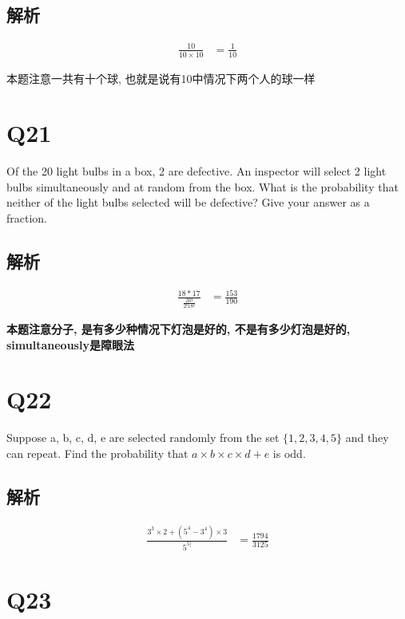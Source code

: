   \subsection{解析}

    \begin{align*}
      \frac{10}{10 \times 10} &= \frac{1}{10}
    \end{align*}

    本题注意一共有十个球, 也就是说有10中情况下两个人的球一样

\section{Q21}

  Of the 20 light bulbs in a box, 2 are defective. An inspector will select
  2 light bulbs simultaneously and at random from the box. What is the
  probability that neither of the light bulbs selected will be defective?
  Give your answer as a fraction.

  \subsection{解析}

    \begin{align*}
      \frac{18 * 17}{\frac{20!}{2! 18!}} &= \frac{153}{190}
    \end{align*}

    \textbf{本题注意分子, 是有多少种情况下灯泡是好的, 不是有多少灯泡是好的,
    simultaneously是障眼法}

\section{Q22}

  Suppose a, b, c, d, e are selected randomly from the set
  $ \{ 1, 2, 3, 4, 5 \} $ and they can repeat. Find the probability that
  $ a \times b \times c \times d + e $ is odd.

  \subsection{解析}

    \begin{align*}
      \frac{3^3 \times 2 + \left( 5^{4} - 3^{4} \right) \times 3}{5^{5]}}
      &= \frac{1794}{3125}
    \end{align*}


\section{Q23}

